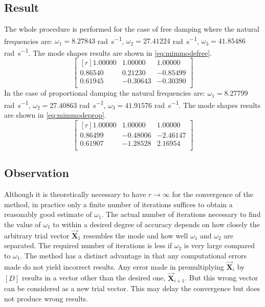\subsection{Result}
\label{ssec:resultmim}
The whole procedure is performed for the case of free damping where the natural
frequencies are: \(\omega_{1} = 8.27843\) \si{\radian\per\second}, \(\omega_{2}
= 27.41224\) \si{\radian\per\second}, \(\omega_{3} = 41.85486\)
\si{\radian\per\second}.
The mode shapes results are shown in \eqref{eq:mimmodefree}.
\begin{equation}\label{eq:mimmodefree}
 \begin{bmatrix*}[r]
	1.00000 & 1.00000 & 1.00000 \\
	0.86540 & 0.21230 &-0.85499 \\
	0.61945 &-0.30643 &-0.30390 \\
	 \end{bmatrix*}
\end{equation}
%
In the case of proportional damping the natural frequencies are:
\(\omega_{1} = 8.27799\) \si{\radian\per\second}, \(\omega_{2} = 27.40863\)
\si{\radian\per\second}, \(\omega_{3} = 41.91576\) \si{\radian\per\second}.
The mode shapes results are shown in \eqref{eq:mimmodeprop}.
 \begin{equation}\label{eq:mimmodeprop}
 \begin{bmatrix*}[r]
	1.00000 & 1.00000 & 1.00000 \\
	0.86499 &-0.48006 &-2.46147 \\
	0.61907 &-1.28528 & 2.16954 \\
	 \end{bmatrix*}
\end{equation}
\subsection{Observation}\label{ssec:observationmim}
Although it is theoretically necessary to have \(r\rightarrow\infty\) for the 
convergence of the method, in practice only a finite number of iterations
suffices to obtain a reasonably good estimate of \(\omega_{1}\).
The actual number of iterations necessary to find the value of \(\omega_1\) to
within a desired degree of accuracy depends on how closely the arbitrary trial
vector \(\vec{\mathbf{X}}_{1}\) resembles the mode and how well \(\omega_1\)
and \(\omega_2\) are separated.
The required number of iterations is less if \(\omega_2\) is very large compared
to \(\omega_{1}\).
The method has a distinct advantage in that any computational errors made do not
yield incorrect results. Any error made in premultiplying
\(\vec{\mathbf{X}}_{i}\) by \([D]\) results in a vector other than the desired
one, \(\vec{\mathbf{X}}_{i+1}\).
But this wrong vector can be considered as a new trial vector.
This may delay the convergence but does not produce wrong results.
